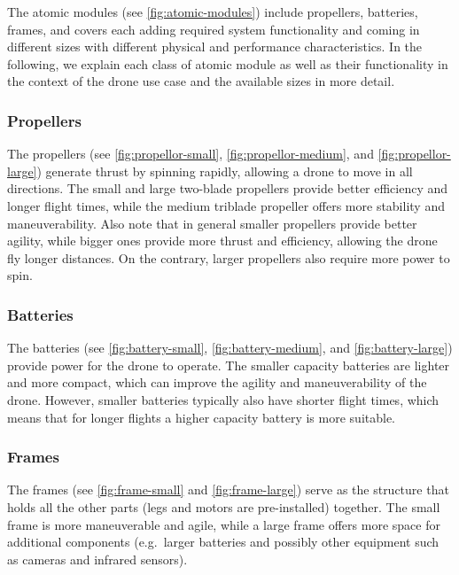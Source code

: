 \documentclass[sigconf,review,anonymous]{acmart}
\begin{document}
The atomic modules (see \cref{fig:atomic-modules}) include propellers, batteries, frames, and covers each adding required system functionality and coming in different sizes with different physical and performance characteristics.
In the following, we explain each class of atomic module as well as their functionality in the context of the drone use case and the available sizes in more detail.

\subsubsection*{Propellers}
\label{sec:propellers}

The propellers (see \cref{fig:propellor-small}, \cref{fig:propellor-medium}, and \cref{fig:propellor-large}) generate thrust by spinning rapidly, allowing a drone to move in all directions. 
The small and large two-blade propellers provide better efficiency and longer flight times, while the medium triblade propeller offers more stability and maneuverability. 
Also note that in general smaller propellers provide better agility, while bigger ones provide more thrust and efficiency, allowing the drone fly longer distances.
On the contrary, larger propellers also require more power to spin.

\subsubsection*{Batteries}
\label{sec:batteries}

The batteries (see \cref{fig:battery-small}, \cref{fig:battery-medium}, and \cref{fig:battery-large}) provide power for the drone to operate. 
The smaller capacity batteries are lighter and more compact, which can improve the agility and maneuverability of the drone. 
However, smaller batteries typically also have shorter flight times, which means that for longer flights a higher capacity battery is more suitable.

\subsubsection*{Frames}
\label{sec:frames}

The frames (see \cref{fig:frame-small} and \cref{fig:frame-large}) serve as the structure that holds all the other parts (legs and motors are pre-installed) together. 
The small frame is more maneuverable and agile, while a large frame offers more space for additional components (e.g.~larger batteries and possibly other equipment such as cameras and infrared sensors).
\end{document}
